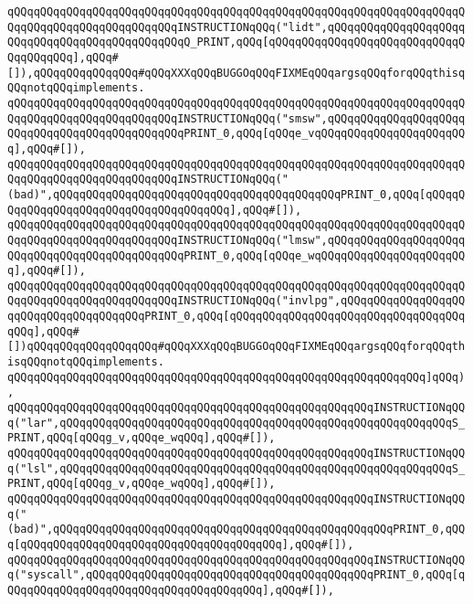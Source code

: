 \verb|qQQqqQQqqQQqqQQqqQQqqQQqqQQqqQQqqQQqqQQqqQQqqQQqqQQqqQQqqQQqqQQqqQQqqQQqqQQqqQQqqQQqqQQqqQQqqQQqINSTRUCTIONqQQq("lidt",qQQqqQQqqQQqqQQqqQQqqQQqqQQqqQQqqQQqqQQqqQQqqQQqQ_PRINT,qQQq[qQQqqQQqqQQqqQQqqQQqqQQqqQQqqQQqqQQqqQQq],qQQq#[]),qQQqqQQqqQQqqQQq#qQQqXXXqQQqBUGGOqQQqFIXMEqQQqargsqQQqforqQQqthisqQQqnotqQQqimplements.|\newline
\verb|qQQqqQQqqQQqqQQqqQQqqQQqqQQqqQQqqQQqqQQqqQQqqQQqqQQqqQQqqQQqqQQqqQQqqQQqqQQqqQQqqQQqqQQqqQQqqQQqINSTRUCTIONqQQq("smsw",qQQqqQQqqQQqqQQqqQQqqQQqqQQqqQQqqQQqqQQqqQQqqQQqPRINT_0,qQQq[qQQqe_vqQQqqQQqqQQqqQQqqQQqqQQq],qQQq#[]),|\newline
\verb|qQQqqQQqqQQqqQQqqQQqqQQqqQQqqQQqqQQqqQQqqQQqqQQqqQQqqQQqqQQqqQQqqQQqqQQqqQQqqQQqqQQqqQQqqQQqqQQqINSTRUCTIONqQQq("(bad)",qQQqqQQqqQQqqQQqqQQqqQQqqQQqqQQqqQQqqQQqqQQqPRINT_0,qQQq[qQQqqQQqqQQqqQQqqQQqqQQqqQQqqQQqqQQqqQQq],qQQq#[]),|\newline
\verb|qQQqqQQqqQQqqQQqqQQqqQQqqQQqqQQqqQQqqQQqqQQqqQQqqQQqqQQqqQQqqQQqqQQqqQQqqQQqqQQqqQQqqQQqqQQqqQQqINSTRUCTIONqQQq("lmsw",qQQqqQQqqQQqqQQqqQQqqQQqqQQqqQQqqQQqqQQqqQQqqQQqPRINT_0,qQQq[qQQqe_wqQQqqQQqqQQqqQQqqQQqqQQq],qQQq#[]),|\newline
\verb|qQQqqQQqqQQqqQQqqQQqqQQqqQQqqQQqqQQqqQQqqQQqqQQqqQQqqQQqqQQqqQQqqQQqqQQqqQQqqQQqqQQqqQQqqQQqqQQqINSTRUCTIONqQQq("invlpg",qQQqqQQqqQQqqQQqqQQqqQQqqQQqqQQqqQQqqQQqPRINT_0,qQQq[qQQqqQQqqQQqqQQqqQQqqQQqqQQqqQQqqQQqqQQq],qQQq#[])qQQqqQQqqQQqqQQqqQQq#qQQqXXXqQQqBUGGOqQQqFIXMEqQQqargsqQQqforqQQqthisqQQqnotqQQqimplements.|\newline
\verb|qQQqqQQqqQQqqQQqqQQqqQQqqQQqqQQqqQQqqQQqqQQqqQQqqQQqqQQqqQQqqQQq]qQQq),|\newline
\verb|qQQqqQQqqQQqqQQqqQQqqQQqqQQqqQQqqQQqqQQqqQQqqQQqqQQqqQQqINSTRUCTIONqQQq("lar",qQQqqQQqqQQqqQQqqQQqqQQqqQQqqQQqqQQqqQQqqQQqqQQqqQQqqQQqqQQqS_PRINT,qQQq[qQQqg_v,qQQqe_wqQQq],qQQq#[]),|\newline
\verb|qQQqqQQqqQQqqQQqqQQqqQQqqQQqqQQqqQQqqQQqqQQqqQQqqQQqqQQqINSTRUCTIONqQQq("lsl",qQQqqQQqqQQqqQQqqQQqqQQqqQQqqQQqqQQqqQQqqQQqqQQqqQQqqQQqqQQqS_PRINT,qQQq[qQQqg_v,qQQqe_wqQQq],qQQq#[]),|\newline
\verb|qQQqqQQqqQQqqQQqqQQqqQQqqQQqqQQqqQQqqQQqqQQqqQQqqQQqqQQqINSTRUCTIONqQQq("(bad)",qQQqqQQqqQQqqQQqqQQqqQQqqQQqqQQqqQQqqQQqqQQqqQQqqQQqPRINT_0,qQQq[qQQqqQQqqQQqqQQqqQQqqQQqqQQqqQQqqQQqqQQq],qQQq#[]),|\newline
\verb|qQQqqQQqqQQqqQQqqQQqqQQqqQQqqQQqqQQqqQQqqQQqqQQqqQQqqQQqINSTRUCTIONqQQq("syscall",qQQqqQQqqQQqqQQqqQQqqQQqqQQqqQQqqQQqqQQqqQQqPRINT_0,qQQq[qQQqqQQqqQQqqQQqqQQqqQQqqQQqqQQqqQQqqQQq],qQQq#[]),|\newline
